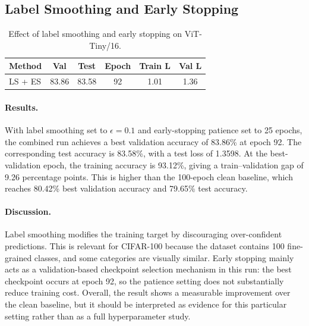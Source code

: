 \subsection{Label Smoothing and Early Stopping}
\label{sec:lsearly}


\begin{table}[!htbp]
\centering
\small
\caption{Effect of label smoothing and early stopping on ViT-Tiny/16.}
\begin{tabular}{lccccc}
\toprule
Method & Val & Test & Epoch & Train L & Val L \\
\midrule
LS + ES & 83.86 & 83.58 & 92 & 1.01 & 1.36 \\
\bottomrule
\end{tabular}
\end{table}
\paragraph{Results.}
With label smoothing set to $\epsilon = 0.1$ and early-stopping patience set to 25 epochs, the combined run achieves a best validation accuracy of 83.86\% at epoch 92. The corresponding test accuracy is 83.58\%, with a test loss of 1.3598. At the best-validation epoch, the training accuracy is 93.12\%, giving a train--validation gap of 9.26 percentage points. This is higher than the 100-epoch clean baseline, which reaches 80.42\% best validation accuracy and 79.65\% test accuracy.

\paragraph{Discussion.}
Label smoothing modifies the training target by discouraging over-confident predictions. This is relevant for CIFAR-100 because the dataset contains 100 fine-grained classes, and some categories are visually similar. Early stopping mainly acts as a validation-based checkpoint selection mechanism in this run: the best checkpoint occurs at epoch 92, so the patience setting does not substantially reduce training cost. Overall, the result shows a measurable improvement over the clean baseline, but it should be interpreted as evidence for this particular setting rather than as a full hyperparameter study.
